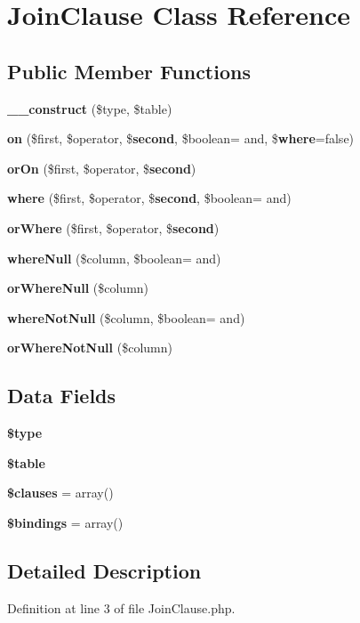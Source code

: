 \section{Join\+Clause Class Reference}
\label{class_illuminate_1_1_database_1_1_query_1_1_join_clause}
\subsection*{Public Member Functions}
\begin{DoxyCompactItemize}
\item 
{\bf \+\_\+\+\_\+construct} (\$type, \$table)
\item 
{\bf on} (\$first, \$operator, \${\bf second}, \$boolean= \textquotesingle{}and\textquotesingle{}, \${\bf where}=false)
\item 
{\bf or\+On} (\$first, \$operator, \${\bf second})
\item 
{\bf where} (\$first, \$operator, \${\bf second}, \$boolean= \textquotesingle{}and\textquotesingle{})
\item 
{\bf or\+Where} (\$first, \$operator, \${\bf second})
\item 
{\bf where\+Null} (\$column, \$boolean= \textquotesingle{}and\textquotesingle{})
\item 
{\bf or\+Where\+Null} (\$column)
\item 
{\bf where\+Not\+Null} (\$column, \$boolean= \textquotesingle{}and\textquotesingle{})
\item 
{\bf or\+Where\+Not\+Null} (\$column)
\end{DoxyCompactItemize}
\subsection*{Data Fields}
\begin{DoxyCompactItemize}
\item 
{\bf \$type}
\item 
{\bf \$table}
\item 
{\bf \$clauses} = array()
\item 
{\bf \$bindings} = array()
\end{DoxyCompactItemize}


\subsection{Detailed Description}


Definition at line 3 of file Join\+Clause.\+php.



